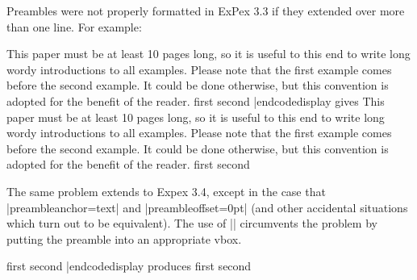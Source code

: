 \noindent Preambles were not properly formatted in ExPex 3.3 if they
extended over more than one line.  For example:

\codedisplay
\pex[preambleoffset=1.5ex,preambleanchor=numright]
This paper must be at least 10 pages long,
so it is useful to this end to write long wordy introductions to
all examples.  Please note that the first example comes before
the second example.  It could be done otherwise, but this
convention is adopted for the benefit of the reader.
\a first
\a second
\xe
|endcodedisplay
gives
\framedisplay
\pex[preambleoffset=1.5ex,preambleanchor=numright]
This paper must be at least 10 pages long,
so it is useful to this end to write long wordy introductions to
all examples.  Please note that the first example comes before
the second example.  It could be done otherwise, but this
convention is adopted for the benefit of the reader.
\a first
\a second
\xe
\endframedisplay

The same problem extends to Expex 3.4, except in the case that
|preambleanchor=text| and |preambleoffset=0pt| (and other
accidental situations which turn out to be equivalent).  The use
of |\multilinepreamble| circumvents the problem by putting the
preamble into an appropriate vbox.

\codedisplay
\pex[preambleoffset=0pt,preambleanchor=labelleft]
\a first
\a second
\xe
|endcodedisplay
produces
\framedisplay
\pex[preambleoffset=0pt,preambleanchor=labelleft]
\a first
\a second
\xe
\endframedisplay


\endinput



\bullsec |lingstyle=frampton|
\lingset{lingstyle=frampton}


\pex[exno=65,preambleanchor=text,preambleoffset=0pt]
This paper must be at least 10 pages long,
so it is useful to this end to write long wordy introductions to
all examples.  Please note that the first example comes before
the second example.  It could be done otherwise, but this
convention is adopted for the benefit of the reader.
\a first
\a second
\xe

